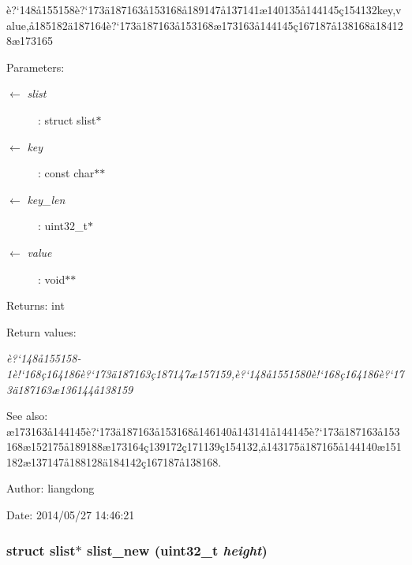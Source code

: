 \`{e}?`148\aa{}155158\`{e}?`173\"{a}187163\aa{}153168\aa{}189147\aa{}137141\ae{}140135\aa{}144145\c{c}154132key,value,\aa{}185182\"{a}187164\`{e}?`173\"{a}187163\aa{}153168\ae{}173163\aa{}144145\c{c}167187\aa{}138168\"{a}184128\ae{}173165 

\begin{Desc}
\item[Parameters:]
\begin{description}
\item[\mbox{$\leftarrow$} {\em slist}]: struct slist$\ast$ \item[\mbox{$\leftarrow$} {\em key}]: const char$\ast$$\ast$ \item[\mbox{$\leftarrow$} {\em key\_\-len}]: uint32\_\-t$\ast$ \item[\mbox{$\leftarrow$} {\em value}]: void$\ast$$\ast$ \end{description}
\end{Desc}
\begin{Desc}
\item[Returns:]int \end{Desc}
\begin{Desc}
\item[Return values:]
\begin{description}
\item[{\em \`{e}?`148\aa{}155158-1\`{e}!`168\c{c}164186\`{e}?`173\"{a}187163\c{c}187147\ae{}157159,\`{e}?`148\aa{}1551580\`{e}!`168\c{c}164186\`{e}?`173\"{a}187163\ae{}136144\aa{}138159}]\end{description}
\end{Desc}
\begin{Desc}
\item[See also:]\ae{}173163\aa{}144145\`{e}?`173\"{a}187163\aa{}153168\aa{}146140\aa{}143141\aa{}144145\`{e}?`173\"{a}187163\aa{}153168\ae{}152175\aa{}189188\ae{}173164\c{c}139172\c{c}171139\c{c}154132,\aa{}143175\"{a}187165\aa{}144140\ae{}151182\ae{}137147\aa{}188128\"{a}184142\c{c}167187\aa{}138168. \end{Desc}
\begin{Desc}
\item[Author:]liangdong \end{Desc}
\begin{Desc}
\item[Date:]2014/05/27 14:46:21 \end{Desc}
\subsubsection{\setlength{\rightskip}{0pt plus 5cm}struct slist$\ast$ slist\_\-new (uint32\_\-t {\em height})}\label{slist_8h_a0}


